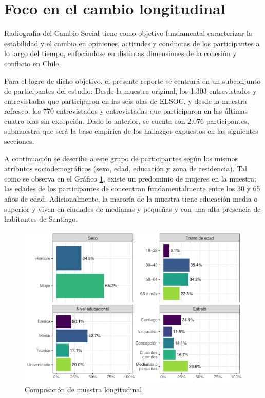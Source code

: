 \documentclass[
  12pt,
]{book}
\begin{document}
\hypertarget{foco-en-el-cambio-longitudinal}{%
\section{Foco en el cambio longitudinal}\label{foco-en-el-cambio-longitudinal}}

Radiografía del Cambio Social tiene como objetivo fundamental caracterizar la estabilidad y el cambio en opiniones, actitudes y conductas de los participantes a lo largo del tiempo, enfocándose en distintas dimensiones de la cohesión y conflicto en Chile.

Para el logro de dicho objetivo, el presente reporte se centrará en un subconjunto de participantes del estudio: Desde la muestra original, los 1.303 entrevistados y entrevistadas que participaron en las seis olas de ELSOC, y desde la muestra refresco, los 770 entrevistados y entrevistadas que participaron en las últimas cuatro olas sin excepción. Dado lo anterior, se cuenta con 2.076 participantes, submuestra que será la base empírica de los hallazgos expuestos en las siguientes secciones.

A continuación se describe a este grupo de participantes según los mismos atributos sociodemográficos (sexo, edad, educación y zona de residencia). Tal como se observa en el Gráfico \ref{fig:graf-composicion-muestra}, existe un predominio de mujeres en la muestra; las edades de los participantes de concentran fundamentalmente entre los 30 y 65 años de edad. Adicionalmente, la maroría de la muestra tiene educación media o superior y viven en ciudades de medianas y pequeñas y con una alta presencia de habitantes de Santiago.

\begin{figure}

{\centering \includegraphics{reporte-elsoc_files/figure-latex/graf-composicion-muestra-1} 

}

\caption{Composición de muestra longitudinal}\label{fig:graf-composicion-muestra}
\end{figure}
\end{document}
